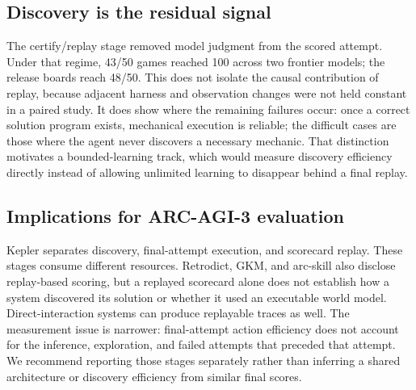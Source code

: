 \documentclass[11pt]{article}
\begin{document}
\subsection{Discovery is the residual signal}\label{sec:residual}

The certify/replay stage removed model judgment from the scored attempt. Under that regime, 43/50 games reached 100 across two frontier models; the release boards reach 48/50. This does not isolate the causal contribution of replay, because adjacent harness and observation changes were not held constant in a paired study. It does show where the remaining failures occur: once a correct solution program exists, mechanical execution is reliable; the difficult cases are those where the agent never discovers a necessary mechanic. That distinction motivates a bounded-learning track, which would measure discovery efficiency directly instead of allowing unlimited learning to disappear behind a final replay.

\subsection{Implications for ARC-AGI-3 evaluation}\label{sec:eval}

Kepler separates discovery, final-attempt execution, and scorecard replay.
These stages consume different resources. Retrodict, GKM, and arc-skill also
disclose replay-based scoring, but a replayed scorecard alone does not establish
how a system discovered its solution or whether it used an executable world
model. Direct-interaction systems can produce replayable traces as well. The
measurement issue is narrower: final-attempt action efficiency does not account
for the inference, exploration, and failed attempts that preceded that attempt.
We recommend reporting those stages separately rather than inferring a shared
architecture or discovery efficiency from similar final scores.
\end{document}
